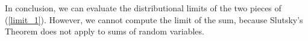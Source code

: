 \documentclass[12pt]{article}
\begin{document}
In conclusion, we can evaluate the distributional limits of the two pieces of (\ref{limit_1}). However, we cannot compute the limit of the sum, because Slutsky's Theorem does not apply to sums of random variables.


% 
% 
\end{document}
